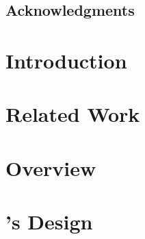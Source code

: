 \documentclass[11pt,twoside,final,natbib=false]{mitthesis}
\begin{document}



\maketitle

\begin{abstractpage}

\end{abstractpage}
\cleardoublepage

\section*{Acknowledgments}
  
\cleardoublepage


\tableofcontents
\clearpage
\listoffigures
\clearpage

\listoftodos


\chapter{Introduction}%
\label{ch:introduction}


\chapter{Related Work}%
\label{ch:related}


\chapter{Overview}%
\label{ch:overview}


\chapter{\sys's Design}%
\label{ch:design}

\end{document}
